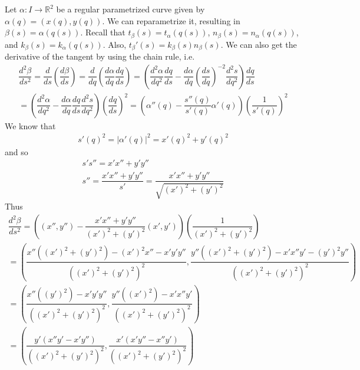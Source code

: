 \documentclass{article}
\newcommand{\R}{\mathbb{R}}
\begin{document}
	Let $\alpha: I \to \R^2$ be a regular parametrized curve given by $\alpha(q) = \left( x(q), y(q) \right)$. We can reparametrize it, resulting in $\beta(s) = \alpha(q(s))$. Recall that $t_{\beta}(s) = t_{\alpha}(q(s))$, $n_{\beta}(s) = n_{\alpha}(q(s))$, and $k_{\beta}(s) = k_{\alpha}(q(s))$. Also, $t_{\beta}'(s) = k_{\beta}(s) n_{\beta}(s)$. We can also get the derivative of the tangent by using the chain rule, i.e.
	\begin{gather*}
		\dfrac{d^2\beta}{ds^2} = \dfrac{d}{ds} \left( \dfrac{d\beta}{ds} \right)
		= \dfrac{d}{dq} \left( \dfrac{d\alpha}{dq} \dfrac{dq}{ds} \right)
		= \left( \dfrac{d^2\alpha}{dq^2} \dfrac{dq}{ds} - \dfrac{d\alpha}{dq} \left( \dfrac{ds}{dq} \right)^{-2} \dfrac{d^2s}{dq^2} \right) \dfrac{dq}{ds} \\
		= \left( \dfrac{d^2\alpha}{dq^2} - \dfrac{d\alpha}{dq} \dfrac{dq}{ds} \dfrac{d^2s}{dq^2} \right) \left( \dfrac{dq}{ds} \right)^2
		= \left( \alpha''(q) - \dfrac{s''(q)}{s'(q)} \alpha'(q) \right) \left( \dfrac{1}{s'(q)} \right)^2
	\end{gather*}
	We know that
	\begin{gather*}
		s'(q)^2 = |\alpha'(q)|^2 = x'(q)^2 + y'(q)^2
	\end{gather*}
	and so
	\begin{gather*}
		s' s'' = x' x'' + y' y'' \\
		s'' = \dfrac{x' x'' + y' y''}{s'} = \dfrac{x' x'' + y' y''}{ \sqrt{\left( x' \right)^2 + \left( y' \right)^2 } }
	\end{gather*}
	Thus
	\begin{gather*}
		\dfrac{d^2\beta}{ds^2} = \left( \left( x'', y'' \right) - \dfrac{x' x'' + y' y''}{ \left( x' \right)^2 + \left( y' \right)^2 } \left( x', y' \right) \right) \left( \dfrac{1}{ \left( x' \right)^2 + \left( y' \right)^2 } \right) \\
		= \left(
		\dfrac{x'' \left( \left( x' \right)^2 + \left( y' \right)^2 \right) - \left( x' \right)^2 x'' - x' y' y''}{ \left( \left( x' \right)^2 + \left( y' \right)^2 \right)^2 },
		\dfrac{y'' \left( \left( x' \right)^2 + \left( y' \right)^2 \right) - x' x'' y' - \left( y' \right)^2 y''}{ \left( \left( x' \right)^2 + \left( y' \right)^2 \right)^2 }
		\right) \\
		= \left(
		\dfrac{x'' \left( \left( y' \right)^2 \right) - x' y' y''}{ \left( \left( x' \right)^2 + \left( y' \right)^2 \right)^2 },
		\dfrac{y'' \left( \left( x' \right)^2\right) - x' x'' y'}{ \left( \left( x' \right)^2 + \left( y' \right)^2 \right)^2 }
		\right) \\
		= \left(
		\dfrac{y' \left( x'' y' - x' y'' \right)}{ \left( \left( x' \right)^2 + \left( y' \right)^2 \right)^2 }, \dfrac{x' \left( x' y'' - x'' y' \right)}{ \left( \left( x' \right)^2 + \left( y' \right)^2 \right)^2 }
		\right)
	\end{gather*}
\end{document}
